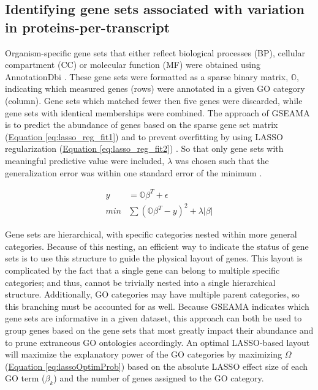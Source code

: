 \subsection{Identifying gene sets associated with variation in proteins-per-transcript}

Organism-specific gene sets that either reflect biological processes (BP), cellular compartment (CC) or molecular function (MF) were obtained using AnnotationDbi \cite{Pages:2008us}. These gene sets were formatted as a sparse binary matrix, $\mathbb{O}$, indicating which measured genes (rows) were annotated in a given GO category (column). Gene sets which matched fewer then five genes were discarded, while gene sets with identical memberships were combined. The approach of GSEAMA is to predict the abundance of genes based on the sparse gene set matrix (\hyperref[eq:lasso_reg_fit1]{Equation \ref{eq:lasso_reg_fit1}}) and to prevent overfitting by using LASSO regularization (\hyperref[eq:lasso_reg_fit2]{Equation \ref{eq:lasso_reg_fit2}}) \cite{Tibshirani:1996wb}. So that only gene sets with meaningful predictive value were included, $\lambda$ was chosen such that the generalization error was within one standard error of the minimum \cite{Friedman:2009ub}.

\begin{subequations}
\begin{align}
y &= \mathbb{O}\beta^{T} + \epsilon\label{eq:lasso_reg_fit1}\\
min &\sum\left(\mathbb{O}\beta^{T} - y\right)^{2} + \lambda |\beta |\label{eq:lasso_reg_fit2}
\end{align}
\end{subequations}

Gene sets are hierarchical, with specific categories nested within more general categories. Because of this nesting, an efficient way to indicate the status of gene sets is to use this structure to guide the physical layout of genes. This layout is complicated by the fact that a single gene can belong to multiple specific categories; and thus, cannot be trivially nested into a single hierarchical structure. Additionally, GO categories may have multiple parent categories, so this branching must be accounted for as well. Because GSEAMA indicates which gene sets are informative in a given dataset, this approach can both be used to group genes based on the gene sets that most greatly impact their abundance and to prune extraneous GO ontologies accordingly. An optimal LASSO-based layout will maximize the explanatory power of the GO categories by maximizing $\Omega$ (\hyperref[eq:lassoOptimProb]{Equation \ref{eq:lassoOptimProb}}) based on the absolute LASSO effect size of each GO term ($\beta_{k}$) and the number of genes assigned to the GO category.

